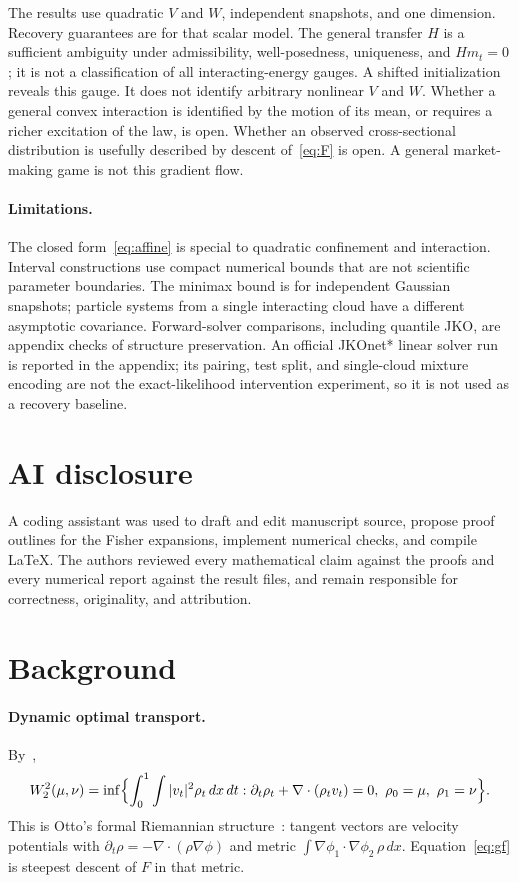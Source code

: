 \documentclass[anon,11pt]{alt2027}
\newcommand{\Wtwo}{W_2}
\begin{document}
The results use quadratic $V$ and $W$, independent snapshots, and one
dimension. Recovery guarantees are for that scalar model. The general transfer
$H$ is a sufficient ambiguity under admissibility, well-posedness, uniqueness,
and $Hm_t=0$; it is not a classification of all interacting-energy gauges. A
shifted initialization reveals this gauge. It does not identify arbitrary
nonlinear $V$ and $W$. Whether a general convex interaction is identified by
the motion of its mean, or requires a richer excitation of the law, is open.
Whether an observed cross-sectional distribution
is usefully described by descent of~\eqref{eq:F} is open. A general
market-making game is not this gradient flow.

\paragraph{Limitations.}
The closed form~\eqref{eq:affine} is special to quadratic confinement and
interaction. Interval constructions use compact numerical bounds that are not
scientific parameter boundaries. The minimax bound is for independent Gaussian
snapshots; particle systems from a single interacting cloud have a different
asymptotic covariance. Forward-solver comparisons, including quantile JKO, are
appendix checks of structure preservation. An official JKOnet* linear solver
run is reported in the appendix; its pairing, test split, and single-cloud
mixture encoding are not the exact-likelihood intervention experiment, so it
is not used as a recovery baseline.

\section*{AI disclosure}
A coding assistant was used to draft and edit manuscript source, propose
proof outlines for the Fisher expansions, implement numerical checks, and
compile \LaTeX. The authors reviewed every mathematical claim against the
proofs and every numerical report against the result files, and remain
responsible for correctness, originality, and attribution.





\appendix

\section{Background}
\label{app:background}

\paragraph{Dynamic optimal transport.}
By~\citet{BenamouBrenier00},
\[
\Wtwo^2(\mu,\nu)
=
\inf\Bigl\{
\int_0^1\int |v_t|^2\rho_t\,dx\,dt:
\partial_t\rho_t+\nabla\cdot(\rho_t v_t)=0,\ 
\rho_0=\mu,\ \rho_1=\nu
\Bigr\}.
\]
This is Otto's formal Riemannian structure~\cite{Otto01}: tangent vectors are
velocity potentials with $\partial_t\rho=-\nabla\cdot(\rho\nabla\phi)$ and metric
$\int\nabla\phi_1\cdot\nabla\phi_2\,\rho\,dx$. Equation~\eqref{eq:gf} is steepest
descent of $F$ in that metric.
\end{document}
